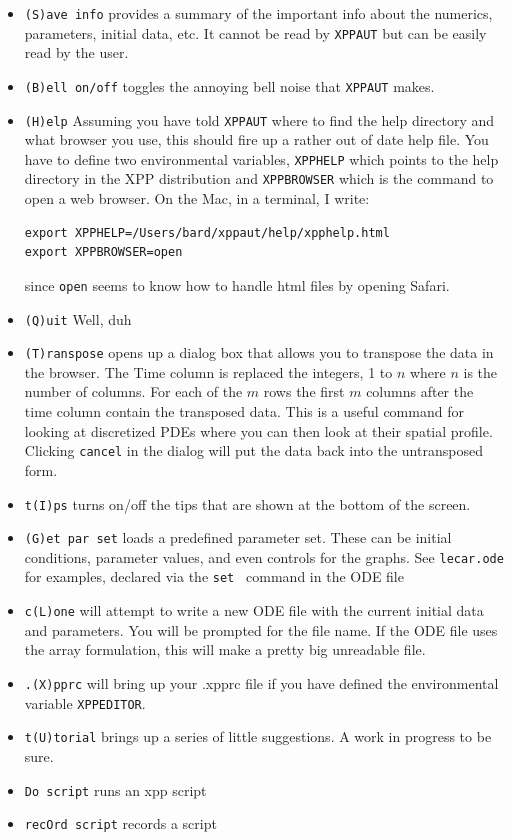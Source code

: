 \documentclass{article}
\begin{document}
\begin{itemize}
\item {\tt (S)ave info}  provides a summary of the important info about the numerics, parameters, initial data, etc.  It cannot be read by {\tt XPPAUT} but can be easily read by the user. 
\item {\tt (B)ell on/off} toggles the annoying bell noise that {\tt XPPAUT} makes.
\item {\tt (H)elp} Assuming you have told {\tt XPPAUT} where to find the help directory and what browser you use, this should fire up a rather out of date help file. You have to define two environmental variables, {\tt XPPHELP} which points to the help directory in the XPP distribution and {\tt XPPBROWSER} which is the command to open a web browser. On the Mac, in a terminal, I write:
\begin{verbatim}
export XPPHELP=/Users/bard/xppaut/help/xpphelp.html
export XPPBROWSER=open
\end{verbatim}
since {\tt open} seems to know how to handle html files by opening Safari.
\item{\tt (Q)uit} Well, duh
\item {\tt (T)ranspose} opens up a dialog box that allows you to transpose the data in the browser. The Time column is replaced the integers, 1 to $n$ where $n$ is the number of columns. For each of the $m$ rows the first $m$ columns after the time column contain the transposed data. This is a useful command for looking at discretized PDEs where you can then look at their spatial profile. Clicking {\tt cancel} in the dialog will put the data back into the untransposed form.
\item {\tt t(I)ps} turns on/off the tips that are shown at the bottom of the screen.
\item {\tt (G)et par set} loads a predefined parameter set. These can be initial conditions, parameter values, and even controls for the graphs. See {\tt lecar.ode} for examples, declared via the {\tt set } command in the ODE file
\item {\tt c(L)one} will attempt to write a new ODE file with the current initial data and parameters. You will be prompted for the file name. If the ODE file uses the array formulation, this will make a pretty big unreadable file.
\item {\tt .(X)pprc} will bring up your .xpprc file if you have defined the environmental variable {\tt XPPEDITOR}.
\item {\tt t(U)torial} brings up a series of little suggestions. A work in progress to be sure.
\item {\tt Do script} runs an xpp script
\item {\tt recOrd script} records a script  
\end{itemize}
\end{document}
